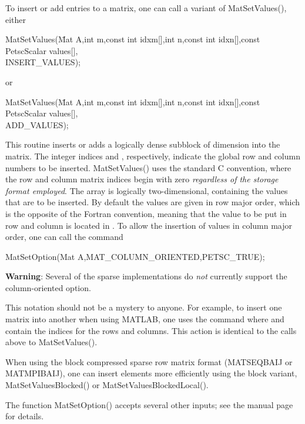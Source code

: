 To insert or add entries to a matrix, one can call a variant of MatSetValues(), either
\begin{tabbing}
  MatSetValues(\=Mat A,int m,const int idxm[],int n,const int idxn[],const PetscScalar values[],\\
            \>INSERT\_VALUES);
\end{tabbing}
or
\begin{tabbing}
  MatSetValues(\=Mat A,int m,const int idxm[],int n,const int idxn[],const PetscScalar values[],\\
            \>ADD\_VALUES);
\end{tabbing}
This routine inserts or adds a logically dense subblock of dimension
 into the
matrix. The integer indices  and , respectively, indicate the
global row and column numbers to be inserted.  MatSetValues() uses the
standard C convention, where the row and column matrix indices begin with
zero {\em regardless of the storage format employed}.   The array
 is logically two-dimensional, containing the values that are
to be inserted. By default the values are given in row major order, which is the
opposite of the Fortran convention, meaning that the value to be put in row
 and column  is located in . To
allow the insertion of values in column major order, one can call the command
\begin{tabbing}
  MatSetOption(Mat A,MAT\_COLUMN\_ORIENTED,PETSC\_TRUE);
\end{tabbing}
{\bf Warning}: Several of the sparse implementations do {\em not} currently
support the column-oriented option.

This notation should not be a mystery to anyone. For example,
to insert one matrix into another when using MATLAB, one uses the command
 where  and  contain the indices for the
rows and columns. This action is identical to the calls above to
MatSetValues().

When using the block compressed sparse row matrix format (MATSEQBAIJ or
MATMPIBAIJ), one can insert elements more efficiently using the block
variant, MatSetValuesBlocked() or MatSetValuesBlockedLocal().

The function MatSetOption() accepts several other inputs; see
the manual page for details.

